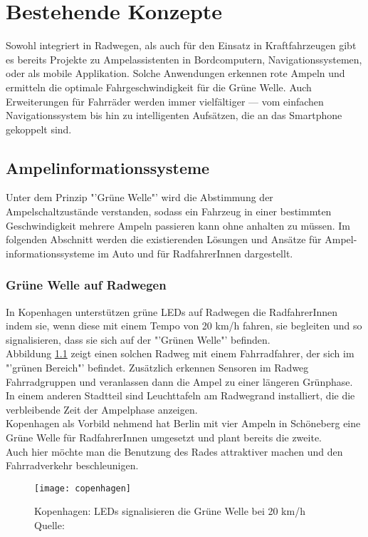 \chapter{\label{chap:state}Bestehende Konzepte}
Sowohl integriert in Radwegen, als auch für den Einsatz in Kraftfahrzeugen gibt es bereits Projekte zu Ampelassistenten in Bordcomputern, Navigationssystemen, oder als mobile Applikation. Solche Anwendungen erkennen rote Ampeln und ermitteln die optimale Fahrgeschwindigkeit für die Grüne Welle. Auch Erweiterungen für Fahrräder werden immer vielfältiger --- vom einfachen Navigationssystem bis hin zu intelligenten Aufsätzen, die an das \gls{Smartphone} gekoppelt sind.
\section{Ampelinformationssysteme}
Unter dem Prinzip "'Grüne Welle"' wird die Abstimmung der Ampelschaltzustände verstanden, sodass ein Fahrzeug in einer bestimmten Geschwindigkeit mehrere Ampeln passieren kann ohne anhalten zu müssen. Im folgenden Abschnitt werden die existierenden Lösungen und Ansätze für Ampel- informationssysteme im Auto und für RadfahrerInnen dargestellt.
\subsection{Grüne Welle auf Radwegen}
In Kopenhagen unterstützen grüne \glspl{LED} auf Radwegen die RadfahrerInnen indem sie, wenn diese mit einem Tempo von 20 km/h fahren, sie begleiten und so signalisieren, dass sie sich auf der "'Grünen Welle"' befinden.\\
Abbildung \ref{fig:copenhagen} zeigt einen solchen Radweg mit einem Fahrradfahrer, der sich im "'grünen Bereich"' befindet. Zusätzlich erkennen Sensoren im Radweg Fahrradgruppen und veranlassen dann die Ampel zu einer längeren Grünphase. In einem anderen Stadtteil sind Leuchttafeln am Radwegrand installiert, die die verbleibende Zeit der Ampelphase anzeigen. \cite{KopIng}\\
Kopenhagen als Vorbild nehmend hat Berlin mit vier Ampeln in Schöneberg eine Grüne Welle für RadfahrerInnen umgesetzt und plant bereits die zweite. \cite{BZ}\\ 
Auch hier möchte man die Benutzung des Rades attraktiver machen und den Fahrradverkehr beschleunigen.
\begin{figure}[H]  
    \centering  
    \texttt{[image: copenhagen]} 
    \grayRule
    \caption[Grüne Welle durch \glspl{LED}]{Kopenhagen: \glspl{LED} signalisieren die Grüne Welle bei 20 km/h  Quelle: \cite{NYT}}
     \label{fig:copenhagen}
\end{figure}
